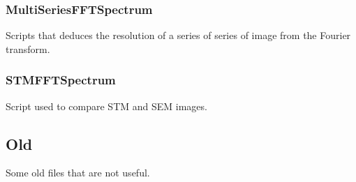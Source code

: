 \subsubsection{MultiSeriesFFTSpectrum}
Scripts that deduces the resolution of a series of series of image from the Fourier transform.

\subsubsection{STMFFTSpectrum}
Script used to compare STM and SEM images.

\subsection{Old}
Some old files that are not useful.

